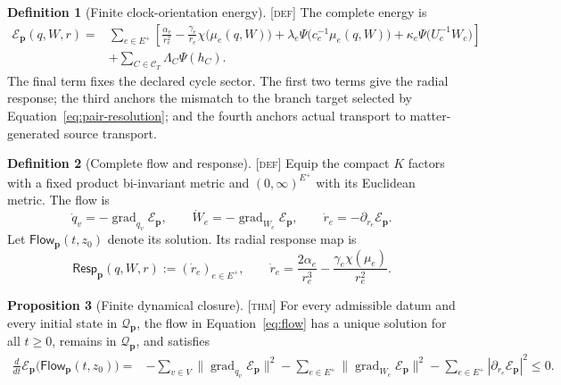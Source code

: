 \documentclass[11pt]{article}
\newcommand{\State}{\ensuremath{\mathcal Q}}
\newcommand{\Defect}{\ensuremath{\mathcal E}}
\newcommand{\Flow}{\ensuremath{\mathsf{Flow}}}
\newcommand{\Resp}{\ensuremath{\mathsf{Resp}}}
\newcommand{\grad}{\operatorname{grad}}
\newcommand{\Defn}{\textsc{[def]}}
\newcommand{\Thm}{\textsc{[thm]}}
\theoremstyle{definition}
\newtheorem{definition}{Definition}[section]
\newtheorem{proposition}[definition]{Proposition}
\begin{document}
\begin{definition}[Finite clock-orientation energy]
\label{def:energy}
\Defn{} The complete energy is
\begin{align}
\Defect_{\mathbf p}(q,W,r)
={}&\sum_{e\in E^+}\left[
\frac{\alpha_e}{r_e^2}
-\frac{\gamma_e}{r_e}\chi\bigl(\mu_e(q,W)\bigr)
+\lambda_e\Psi\bigl(c_e^{-1}\mu_e(q,W)\bigr)
+\kappa_e\Psi\bigl(U_e^{-1}W_e\bigr)
\right] \nonumber\\
&+\sum_{C\in\mathcal C_T}\Lambda_C\Psi(h_C).
\label{eq:energy}
\end{align}
The final term fixes the declared cycle sector.  The first two terms give the
radial response; the third anchors the mismatch to the branch target selected by
Equation~\eqref{eq:pair-resolution}; and the fourth anchors actual transport to
matter-generated source transport.
\end{definition}

\begin{definition}[Complete flow and response]
\label{def:flow}
\Defn{} Equip the compact $K$ factors with a fixed product bi-invariant metric
and $(0,\infty)^{E^+}$ with its Euclidean metric.  The flow is
\begin{equation}
\dot q_v=-\grad_{q_v}\Defect_{\mathbf p},
\qquad
\dot W_e=-\grad_{W_e}\Defect_{\mathbf p},
\qquad
\dot r_e=-\partial_{r_e}\Defect_{\mathbf p}.
\label{eq:flow}
\end{equation}
Let $\Flow_{\mathbf p}(t,z_0)$ denote its solution.  Its radial response map is
\begin{equation}
\Resp_{\mathbf p}(q,W,r):=(\dot r_e)_{e\in E^+},
\qquad
\dot r_e=
\frac{2\alpha_e}{r_e^3}
-\frac{\gamma_e\chi(\mu_e)}{r_e^2}.
\label{eq:response}
\end{equation}
\end{definition}

\begin{proposition}[Finite dynamical closure]
\label{prop:closure}
\Thm{} For every admissible datum and every initial state in
$\State_{\mathbf p}$, the flow in Equation~\eqref{eq:flow} has a unique solution
for all $t\ge0$, remains in $\State_{\mathbf p}$, and satisfies
\begin{align}
\frac{d}{dt}\Defect_{\mathbf p}\bigl(\Flow_{\mathbf p}(t,z_0)\bigr)
={}&-\sum_{v\in V}\|\grad_{q_v}\Defect_{\mathbf p}\|^2
-\sum_{e\in E^+}\|\grad_{W_e}\Defect_{\mathbf p}\|^2
-\sum_{e\in E^+}|\partial_{r_e}\Defect_{\mathbf p}|^2
\le0.
\label{eq:descent}
\end{align}
\end{proposition}
\end{document}
